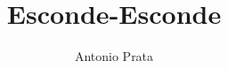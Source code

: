 \documentclass[11pt]{extarticle}
\newcommand{\AutorLivro}{Antonio Prata}
\newcommand{\TituloLivro}{Esconde-Esconde}
\newcommand{\colaborador}{Gabriela Karam}
\begin{document}
\title{\TituloLivro}
\author{\AutorLivro}
\def\authornotes{\colaborador}

\date{}
\maketitle


\tableofcontents











\end{document}
